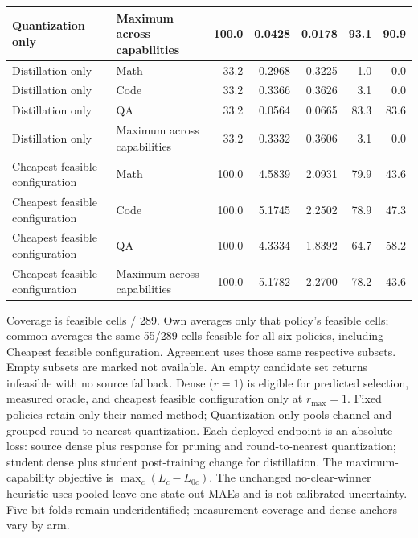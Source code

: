 \begin{table}[!htbp]
\begin{tabular*}{\textwidth}{@{\extracolsep{\fill}}llrrrrr@{}}
Quantization only & \shortstack[l]{Maximum across\\capabilities} & 100.0 & 0.0428 & 0.0178 & 93.1 & 90.9 \\
\midrule
Distillation only & Math & 33.2 & 0.2968 & 0.3225 & 1.0 & 0.0 \\
Distillation only & Code & 33.2 & 0.3366 & 0.3626 & 3.1 & 0.0 \\
Distillation only & QA & 33.2 & 0.0564 & 0.0665 & 83.3 & 83.6 \\
Distillation only & \shortstack[l]{Maximum across\\capabilities} & 33.2 & 0.3332 & 0.3606 & 3.1 & 0.0 \\
\midrule
\shortstack[l]{Cheapest feasible\\configuration} & Math & 100.0 & 4.5839 & 2.0931 & 79.9 & 43.6 \\
\shortstack[l]{Cheapest feasible\\configuration} & Code & 100.0 & 5.1745 & 2.2502 & 78.9 & 47.3 \\
\shortstack[l]{Cheapest feasible\\configuration} & QA & 100.0 & 4.3334 & 1.8392 & 64.7 & 58.2 \\
\shortstack[l]{Cheapest feasible\\configuration} & \shortstack[l]{Maximum across\\capabilities} & 100.0 & 5.1782 & 2.2700 & 78.2 & 43.6 \\
\bottomrule
\end{tabular*}
\par\smallskip
\begin{minipage}{\linewidth}\small
Coverage is feasible cells / 289. Own averages only that policy's feasible cells; common averages the same 55/289 cells feasible for all six policies, including Cheapest feasible configuration. Agreement uses those same respective subsets. Empty subsets are marked not available. An empty candidate set returns infeasible with no source fallback. Dense ($r=1$) is eligible for predicted selection, measured oracle, and cheapest feasible configuration only at $r_{\max}=1$. Fixed policies retain only their named method; Quantization only pools channel and grouped round-to-nearest quantization. Each deployed endpoint is an absolute loss: source dense plus response for pruning and round-to-nearest quantization; student dense plus student post-training change for distillation. The maximum-capability objective is $\max_c(L_c-L_{0c})$. The unchanged no-clear-winner heuristic uses pooled leave-one-state-out MAEs and is not calibrated uncertainty. Five-bit folds remain underidentified; measurement coverage and dense anchors vary by arm.
\end{minipage}
\end{table}
